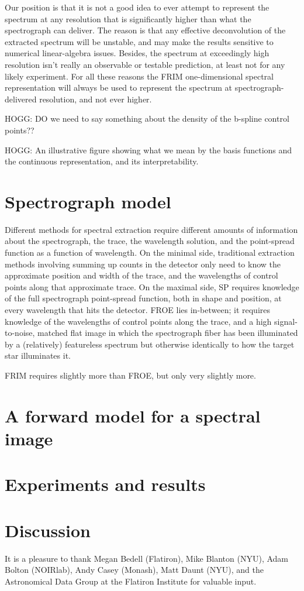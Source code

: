 \documentclass[modern]{aastex631}
\begin{document}
Our position is that it is not a good idea to ever attempt to represent the spectrum at any resolution that is significantly higher than what the spectrograph can deliver.
The reason is that any effective deconvolution of the extracted spectrum will be unstable, and may make the results sensitive to numerical linear-algebra issues.
Besides, the spectrum at exceedingly high resolution isn't really an observable or testable prediction, at least not for any likely experiment.
For all these reasons the FRIM one-dimensional spectral representation will always be used to represent the spectrum at spectrograph-delivered resolution, and not ever higher.

HOGG: DO we need to say something about the density of the b-spline control points??

HOGG: An illustrative figure showing what we mean by the basis functions and the continuous representation, and its interpretability.

\section{Spectrograph model}

Different methods for spectral extraction require different amounts of information about the spectrograph, the trace, the wavelength solution, and the point-spread function as a function of wavelength.
On the minimal side, traditional extraction methods involving summing up counts in the detector only need to know the approximate position and width of the trace, and the wavelengths of control points along that approximate trace.
On the maximal side, SP requires knowledge of the full spectrograph point-spread function, both in shape and position, at every wavelength that hits the detector.
FROE lies in-between; it requires knowledge of the wavelengths of control points along the trace, and a high signal-to-noise, matched flat image in which the spectrograph fiber has been illuminated by a (relatively) featureless spectrum but otherwise identically to how the target star illuminates it.

FRIM requires slightly more than FROE, but only very slightly more.

\section{A forward model for a spectral image}

\section{Experiments and results}

\section{Discussion}

\begin{acknowledgments}
It is a pleasure to thank
Megan Bedell (Flatiron),
Mike Blanton (NYU),
Adam Bolton (NOIRlab),
Andy Casey (Monash),
Matt Daunt (NYU),
and the Astronomical Data Group at the Flatiron Institute for valuable input.
\end{acknowledgments}
\end{document}
